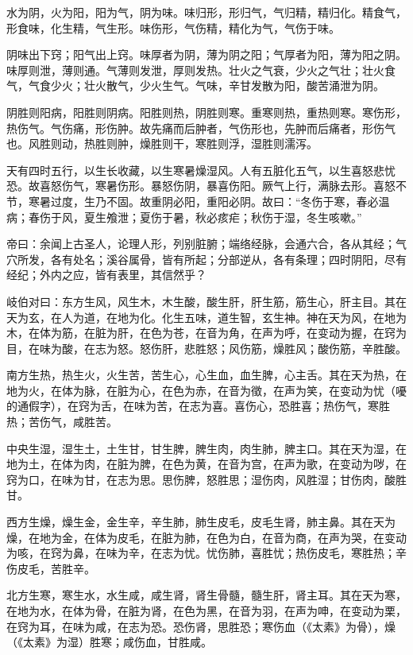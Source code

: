 \documentclass{article}%
\begin{document}
水为阴，火为阳，阳为气，阴为味。味归形，形归气，气归精，精归化。精食气，形食味，化生精，气生形。味伤形，气伤精，精化为气，气伤于味。

阴味出下窍；阳气出上窍。味厚者为阴，薄为阴之阳；气厚者为阳，薄为阳之阴。味厚则泄，薄则通。气薄则发泄，厚则发热。壮火之气衰，少火之气壮；壮火食气，气食少火；壮火散气，少火生气。气味，辛甘发散为阳，酸苦涌泄为阴。

阴胜则阳病，阳胜则阴病。阳胜则热，阴胜则寒。重寒则热，重热则寒。寒伤形，热伤气。气伤痛，形伤肿。故先痛而后肿者，气伤形也，先肿而后痛者，形伤气也。风胜则动，热胜则肿，燥胜则干，寒胜则浮，湿胜则濡泻。

天有四时五行，以生长收藏，以生寒暑燥湿风。人有五脏化五气，以生喜怒悲忧恐。故喜怒伤气，寒暑伤形。暴怒伤阴，暴喜伤阳。厥气上行，满脉去形。喜怒不节，寒暑过度，生乃不固。故重阴必阳，重阳必阴。故曰：“冬伤于寒，春必温病；春伤于风，夏生飧泄；夏伤于暑，秋必痎疟；秋伤于湿，冬生咳嗽。”

帝曰：余闻上古圣人，论理人形，列别脏腑；端络经脉，会通六合，各从其经；气穴所发，各有处名；溪谷属骨，皆有所起；分部逆从，各有条理；四时阴阳，尽有经纪；外内之应，皆有表里，其信然乎？

岐伯对曰：东方生风，风生木，木生酸，酸生肝，肝生筋，筋生心，肝主目。其在天为玄，在人为道，在地为化。化生五味，道生智，玄生神。神在天为风，在地为木，在体为筋，在脏为肝，在色为苍，在音为角，在声为呼，在变动为握，在窍为目，在味为酸，在志为怒。怒伤肝，悲胜怒；风伤筋，燥胜风；酸伤筋，辛胜酸。

南方生热，热生火，火生苦，苦生心，心生血，血生脾，心主舌。其在天为热，在地为火，在体为脉，在脏为心，在色为赤，在音为徵，在声为笑，在变动为忧（嚘的通假字），在窍为舌，在味为苦，在志为喜。喜伤心，恐胜喜；热伤气，寒胜热；苦伤气，咸胜苦。

中央生湿，湿生土，土生甘，甘生脾，脾生肉，肉生肺，脾主口。其在天为湿，在地为土，在体为肉，在脏为脾，在色为黄，在音为宫，在声为歌，在变动为哕，在窍为口，在味为甘，在志为思。思伤脾，怒胜思；湿伤肉，风胜湿；甘伤肉，酸胜甘。

西方生燥，燥生金，金生辛，辛生肺，肺生皮毛，皮毛生肾，肺主鼻。其在天为燥，在地为金，在体为皮毛，在脏为肺，在色为白，在音为商，在声为哭，在变动为咳，在窍为鼻，在味为辛，在志为忧。忧伤肺，喜胜忧；热伤皮毛，寒胜热；辛伤皮毛，苦胜辛。

北方生寒，寒生水，水生咸，咸生肾，肾生骨髓，髓生肝，肾主耳。其在天为寒，在地为水，在体为骨，在脏为肾，在色为黑，在音为羽，在声为呻，在变动为栗，在窍为耳，在味为咸，在志为恐。恐伤肾，思胜恐；寒伤血（《太素》为骨），燥（《太素》为湿）胜寒；咸伤血，甘胜咸。
\end{document}
